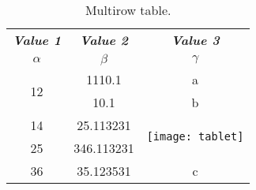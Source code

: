 \documentclass{article}
\begin{document}
	
	\begin{table}[h!]
		\begin{center}
			\caption{Multirow table.}
			\label{tab:table1}
			\begin{tabular}{c|c|c}
				\hline
				\textbf\textit{Value 1} & \textbf\textit{Value 2} & \textbf\textit{Value 3}\\
				$\alpha$ & $\beta$ & $\gamma$ \\
				\hline
				\multirow{2}{*}{12} & 1110.1 & a\\
				& 10.1 & b\\
				\hline
				14 & 25.113231 &
				\multirow{2}{*}{\texttt{[image: tablet]}}\\
				25 & 346.113231 & \\
				\hline
				36 & 35.123531 & c \\
				\hline
				\end{tabular}
		\end{center}
	\end{table}
\end{document}
